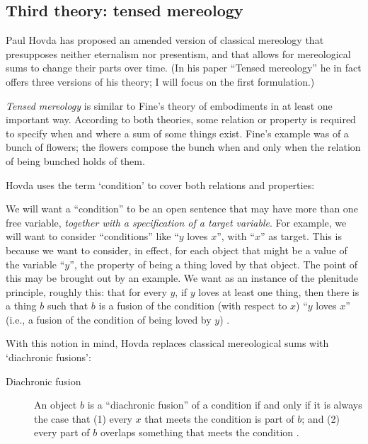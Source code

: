 \documentclass[11pt]{article}
\newenvironment{squote}{%
\begin{spacing}{1}
\begin{list}{}{%
\setlength{\labelwidth}{0pt}%
\rightmargin\leftmargin%
}
\item\relax
}{%
\end{list}%
\end{spacing}
}
\begin{document}
\begin{spacing}{1.5}
\section{Third theory: tensed mereology}
\label{hovda}
Paul Hovda has proposed an amended version of classical mereology that
presupposes neither eternalism nor presentism, and that allows for
mereological sums to change their parts over time.  (In his paper
``Tensed mereology'' \citeyearpar{hovda2011} he in fact offers three
versions of his theory; I will focus on the first formulation.)

{\em Tensed mereology} is similar to Fine's theory of embodiments in
at least one important way.  According to both theories, some relation
or property is required to specify when and where a sum of some things
exist.  Fine's example was of a bunch of flowers; the flowers compose
the bunch when and only when the relation of being bunched holds of
them.

Hovda uses the term `condition' to cover both relations and
properties:

\begin{squote}
We will want a ``condition'' to be an open sentence that may have more
than one free variable, \emph{together with a specification of a
  target variable}. For example, we will want to consider
``conditions'' like ``$y$ loves $x$'', with ``$x$'' as target.  This
is because we want to consider, in effect, for each object that might
be a value of the variable ``$y$'', the property of being a thing
loved by that object.  The point of this may be brought out by an
example.  We want as an instance of the plenitude principle, roughly
this: that for every $y$, if $y$ loves at least one thing, then there
is a thing $b$ such that $b$ is a fusion of the condition (with
respect to $x$) ``$y$ loves $x$'' (i.e., a fusion of the condition of
being loved by $y$) \citeyearpar[3n]{hovda2011}.
\end{squote}

With this notion in mind, Hovda replaces classical mereological sums
with `diachronic fusions':

\begin{description}
  \item[Diachronic fusion] An object $b$ is a ``diachronic fusion'' of
    a condition if and only if it is always the case that (1) every
    $x$ that meets the condition is part of $b$; and (2) every part of
    $b$ overlaps something that meets the condition
    \citeyearpar[3--4]{hovda2011}.
\end{description}


\end{spacing}
\end{document}
